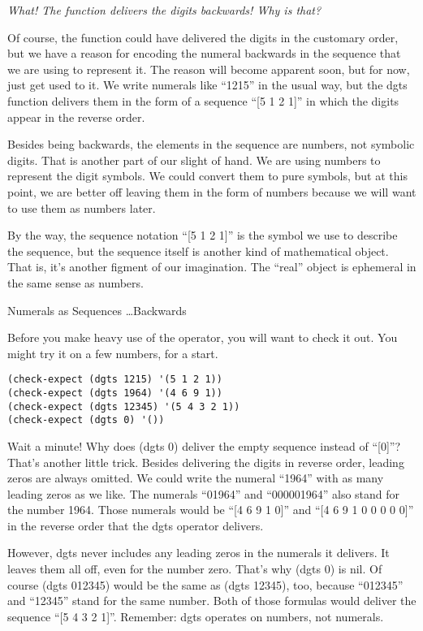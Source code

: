 \begin{aside}
\emph{What! The function delivers the digits backwards! Why is that?}

Of course, the function could have delivered the digits in the
customary order, but we have a reason for encoding the numeral
backwards in the sequence that we are using to represent it.
The reason will become apparent soon, but for now, just get used
to it. We write numerals like ``1215'' in the usual way, but
the dgts function delivers them in the form of
a sequence ``[5 1 2 1]'' in which the digits appear in the
reverse order.

Besides being backwards, the elements in the sequence are numbers,
not symbolic digits.
That is another part of our slight of hand.
We are using numbers to represent the digit symbols.
We could convert them to pure symbols,
but at this point, we are better off leaving them in the form of numbers
because we will want to use them as numbers later.

By the way, the sequence notation ``[5 1 2 1]'' is the symbol we use
to describe the sequence, but the sequence itself is another kind of mathematical object.
That is, it's another figment of our imagination.
The ``real'' object is ephemeral in the same sense as numbers.
\caption{Numerals as Sequences \dots Backwards}
\label{numeral-as-sequence}
\end{aside}

Before you make heavy use of the operator, you will want to check it out.
You might try it on a few numbers, for a start.
\begin{Verbatim}
(check-expect (dgts 1215) '(5 1 2 1))
(check-expect (dgts 1964) '(4 6 9 1))
(check-expect (dgts 12345) '(5 4 3 2 1))
(check-expect (dgts 0) '())
\end{Verbatim}

Wait a minute!
Why does (dgts 0) deliver the empty sequence instead of ``[0]''?
That's another little trick.
Besides delivering the digits in reverse order, leading zeros are always omitted.
We could write the numeral ``1964'' with as many leading zeros as we like.
The numerals ``01964'' and ``000001964'' also stand for the number 1964.
Those numerals would be ``[4 6 9 1 0]'' and ``[4 6 9 1 0 0 0 0 0]'' in
the reverse order that the dgts operator delivers.

However, dgts never includes any leading zeros in the numerals it delivers.
It leaves them all off, even for the number zero.
That's why (dgts 0) is nil.
Of course (dgts 012345) would be the same as (dgts 12345), too,
because ``012345'' and ``12345'' stand for the same number.
Both of those formulas would deliver the sequence ``[5 4 3 2 1]''.
Remember: dgts operates on numbers, not numerals.

